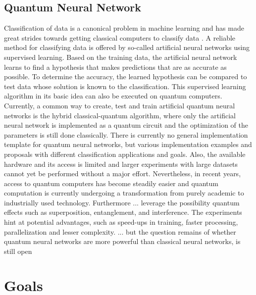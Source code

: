 \subsection{Quantum Neural Network}
Classification of data is a canonical problem in machine learning and has made great strides towards getting classical computers to classify data \cite{Killoran_2019,ClassificationWithQNN}. A reliable method for classifying data is offered by so-called artificial neural networks using supervised learning. Based on the training data, the artificial neural network learns to find a hypothesis that makes predictions that are as accurate as possible. To determine the accuracy, the learned hypothesis can be compared to test data whose solution is known to the classification. This supervised learning algorithm in its basic idea can also be executed on quantum computers. Currently, a common way to create, test and train artificial quantum neural networks is the hybrid classical-quantum algorithm, where only the artificial neural network is implemented as a quantum circuit and the optimization of the parameters is still done classically\cite{mccleanBarrenPlateausQuantum2018,Zhao_2021,schuld_SQMLmodelsAreKernelMethods,sim_expressibility_2019}.
There is currently no general implementation template for quantum neural networks, but various implementation examples and proposals with different classification applications and goals. Also, the available hardware and its access is limited and larger experiments with large datasets cannot yet be performed without a major effort. Nevertheless, in recent years, access to quantum computers has become steadily easier and quantum computation is currently undergoing a transformation from purely academic to industrially used technology\cite{schuldCircuitcentricQuantumClassifiers2020}. Furthermore ... leverage the possibility quantum effects such as superposition, entanglement, and interference. The experiments hint at potential advantages, such as speed-ups in training, faster processing, parallelization and lesser complexity. ... but the question remains of whether quantum neural networks are more powerful than classical neural networks, is still open

\section{Goals}

